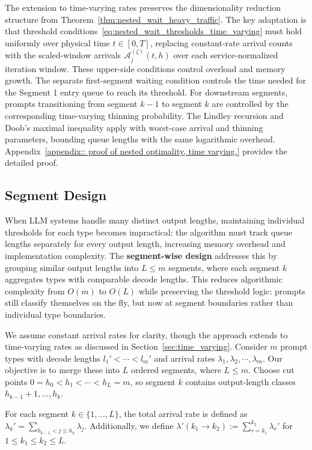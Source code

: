 The extension to time-varying rates preserves the dimensionality reduction structure from Theorem~\ref{thm:nested_wait_heavy_traffic}. The key adaptation is that threshold conditions~\eqref{eq:nested_wait_thresholds_time_varying} must hold uniformly over physical time \(t \in[0,T]\), replacing constant-rate arrival counts with the scaled-window arrivals \(\mathcal A_j^{(\zeta)}(t,h)\) over each service-normalized iteration window. These upper-side conditions control overload and memory growth. The separate first-segment waiting condition controls the time needed for the Segment 1 entry queue to reach its threshold. For downstream segments, prompts transitioning from segment \(k-1\) to segment \(k\) are controlled by the corresponding time-varying thinning probability. The Lindley recursion and Doob's maximal inequality apply with worst-case arrival and thinning parameters, bounding queue lengths with the same logarithmic overhead. Appendix~\ref{appendix:: proof of nested optimality, time varying.} provides the detailed proof.

\subsection{Segment Design}\label{sec:segment_design}

When LLM systems handle many distinct output lengths, maintaining individual thresholds for each type becomes impractical: the algorithm must track queue lengths separately for every output length, increasing memory overhead and implementation complexity. The \textbf{segment-wise design} addresses this by grouping similar output lengths into $L \leq m$ segments, where each segment $k$ aggregates types with comparable decode lengths. This reduces algorithmic complexity from $O(m)$ to $O(L)$ while preserving the threshold logic: prompts still classify themselves on the fly, but now at segment boundaries rather than individual type boundaries.

We assume constant arrival rates for clarity, though the approach extends to time-varying rates as discussed in Section~\ref{sec:time_varying}. Consider $m$ prompt types with decode lengths $l_1' < \cdots < l_m'$ and arrival rates $\lambda_1, \lambda_2, \cdots, \lambda_m$. Our objective is to merge these into $L$ ordered segments, where $L \leq m$. Choose cut points \(0=h_0<h_1<\cdots<h_L=m\), so segment \(k\) contains output-length classes \(h_{k-1}+1,\ldots,h_k\).

For each segment $k \in \{1, \dots, L\}$, the total arrival rate is defined as $\lambda_k' = \sum_{h_{k-1}< j\le h_k} \lambda_j$. Additionally, we define $\lambda'(k_1 \to k_2) := \sum_{r=k_1}^{k_2} \lambda_r'$ for $1 \leq k_1 \leq k_2 \leq L$.

